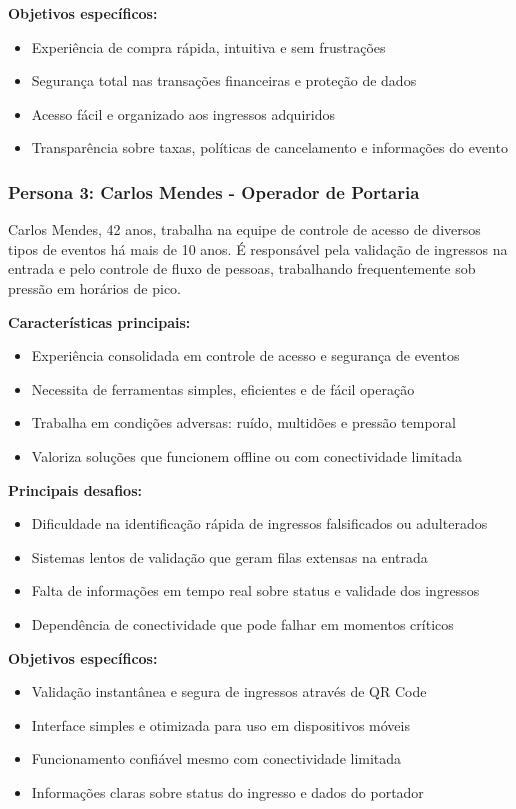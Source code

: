 \textbf{Objetivos específicos:}
\begin{itemize}
    \item Experiência de compra rápida, intuitiva e sem frustrações
    \item Segurança total nas transações financeiras e proteção de dados
    \item Acesso fácil e organizado aos ingressos adquiridos
    \item Transparência sobre taxas, políticas de cancelamento e informações do evento
\end{itemize}

\subsubsection{Persona 3: Carlos Mendes - Operador de Portaria}

Carlos Mendes, 42 anos, trabalha na equipe de controle de acesso de diversos tipos de eventos há mais de 10 anos. É responsável pela validação de ingressos na entrada e pelo controle de fluxo de pessoas, trabalhando frequentemente sob pressão em horários de pico.

\textbf{Características principais:}
\begin{itemize}
    \item Experiência consolidada em controle de acesso e segurança de eventos
    \item Necessita de ferramentas simples, eficientes e de fácil operação
    \item Trabalha em condições adversas: ruído, multidões e pressão temporal
    \item Valoriza soluções que funcionem offline ou com conectividade limitada
\end{itemize}

\textbf{Principais desafios:}
\begin{itemize}
    \item Dificuldade na identificação rápida de ingressos falsificados ou adulterados
    \item Sistemas lentos de validação que geram filas extensas na entrada
    \item Falta de informações em tempo real sobre status e validade dos ingressos
    \item Dependência de conectividade que pode falhar em momentos críticos
\end{itemize}

\textbf{Objetivos específicos:}
\begin{itemize}
    \item Validação instantânea e segura de ingressos através de QR Code
    \item Interface simples e otimizada para uso em dispositivos móveis
    \item Funcionamento confiável mesmo com conectividade limitada
    \item Informações claras sobre status do ingresso e dados do portador
\end{itemize}

